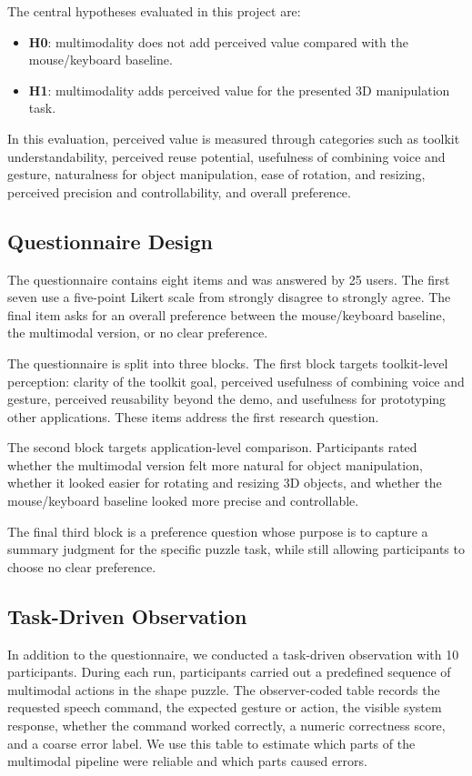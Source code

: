 \documentclass[sigconf]{acmart}
\begin{document}
The central hypotheses evaluated in this project are:

\begin{itemize}[leftmargin=*]
  \item \textbf{H0}: multimodality does not add perceived value compared with the
  mouse/keyboard baseline.
  \item \textbf{H1}: multimodality adds perceived value for the presented 3D
  manipulation task.
\end{itemize}

In this evaluation, perceived value is measured through categories such as
toolkit understandability, perceived reuse potential, usefulness of combining
voice and gesture, naturalness for object manipulation, ease of rotation, and
resizing, perceived precision and controllability, and overall preference.

\subsection{Questionnaire Design}
The questionnaire contains eight items and was answered by 25 users.
The first seven use a five-point Likert scale from strongly disagree to
strongly agree. The final item asks for an overall preference between
the mouse/keyboard baseline, the multimodal version, or no clear preference.

The questionnaire is split into three blocks. The first block targets
toolkit-level perception: clarity of the toolkit goal, perceived usefulness of
combining voice and gesture, perceived reusability beyond the demo, and
usefulness for prototyping other applications. These items address the first
research question.

The second block targets application-level comparison. Participants rated
whether the multimodal version felt more natural for object manipulation,
whether it looked easier for rotating and resizing 3D objects, and whether the
mouse/keyboard baseline looked more precise and controllable.

The final third block is a preference question whose purpose is to capture a
summary judgment for the specific puzzle task, while still allowing
participants to choose no clear preference.

\subsection{Task-Driven Observation}
In addition to the questionnaire, we conducted a task-driven observation with
10 participants. During each run, participants carried out a predefined sequence
of multimodal actions in the shape puzzle. The observer-coded table records the
requested speech command, the expected gesture or action, the visible system
response, whether the command worked correctly, a numeric correctness score,
and a coarse error label. We use this table to estimate which parts of the
multimodal pipeline were reliable and which parts caused errors.
\end{document}
